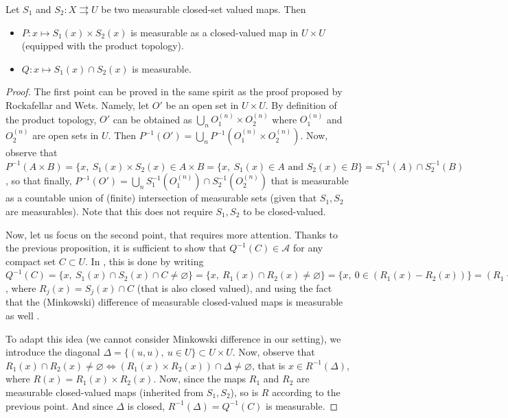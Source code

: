     \begin{proposition}\label{prop:intersection_of_measurable}
        Let $S_1$ and $S_2 : X \rightrightarrows U$ be two measurable closed-set valued maps.
        Then
        \begin{itemize}[nolistsep]
            \item $P : x \mapsto S_1(x) \times S_2(x)$ is measurable as a closed-valued map in $U \times U$ (equipped with the product topology).
            \item $Q : x \mapsto S_1(x) \cap S_2(x)$ is measurable.
        \end{itemize}
    \end{proposition}

    \begin{proof}
    The first point can be proved in the same spirit as the proof proposed by Rockafellar and Wets. Namely, let $O'$ be an open set in $U \times U$. By definition of the product topology, $O'$ can be obtained as $\bigcup_n O_1^{(n)} \times O_2^{(n)}$ where $O_1^{(n)}$ and $O_2^{(n)}$ are open sets in $U$. Then $P^{-1}(O') = \bigcup_n P^{-1}(O_1^{(n)} \times O_2^{(n)})$. Now, observe that $P^{-1}(A \times B) = \{ x,\ S_1(x) \times S_2(x) \in A \times B = \{x,\ S_1(x) \in A \text{ and } S_2(x) \in B \} = S_1^{-1}(A) \cap S_2^{-1}(B)$, so that finally, $P^{-1}(O') = \bigcup_n S_1^{-1}(O_1^{(n)}) \cap S_2^{-1}(O_2^{(n)})$ that is measurable as a countable union of (finite) intersection of measurable sets (given that $S_1, S_2$ are measurables). Note that this does not require $S_1,S_2$ to be closed-valued.

    Now, let us focus on the second point, that requires more attention. Thanks to the previous proposition, it is sufficient to show that $Q^{-1}(C) \in \mathcal{A}$ for any compact set $C \subset U$.
    In \cite{rockafellar2009variational}, this is done by writing $Q^{-1}(C) = \{ x,\ S_1(x) \cap S_2(x) \cap C \neq \varnothing \} = \{x,\ R_1(x) \cap R_2(x) \neq \varnothing \} = \{x,\ 0 \in (R_1(x) - R_2(x)) \} = (R_1 - R_2)^{-1}(\{0\})$, where $R_j(x) = S_j(x) \cap C$ (that is also closed valued), and using the fact that the (Minkowski) difference of measurable closed-valued maps is measurable as well \cite[Prop.~14.11.c]{rockafellar2009variational}.

    To adapt this idea (we cannot consider Minkowski difference in our setting), we introduce the diagonal $\Delta = \{(u,u),\ u \in U\} \subset U \times U$. Now, observe that $R_1(x) \cap R_2(x) \neq \varnothing \Leftrightarrow (R_1(x) \times R_2(x)) \cap \Delta \neq \varnothing$, that is $x \in R^{-1}(\Delta)$, where $R(x) = R_1(x) \times R_2(x)$. Now, since the maps $R_1$ and $R_2$ are measurable closed-valued maps (inherited from $S_1,S_2$), so is $R$ according to the previous point. And since $\Delta$ is closed, $R^{-1}(\Delta) = Q^{-1}(C)$ is measurable.
    \end{proof}


